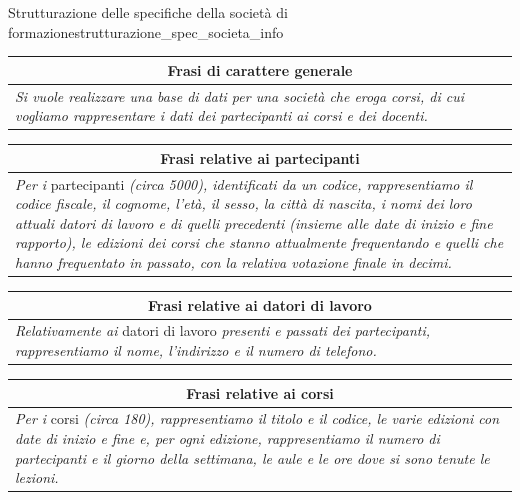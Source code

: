 \documentclass[12pt]{report}
\newcommand{\nmu}{}
\begin{document}
 	\begin{example}{\nmu Strutturazione delle specifiche della società di formazione}{strutturazione_spec_societa_info}
 		\noindent
 		\begin{tabular}{|p{14cm}|}
 			\hline
 			\multicolumn{1}{|c|}{\textbf{Frasi di carattere generale}} \\
 			\hline
 			\textit{Si vuole realizzare una base di dati per una società che eroga corsi, di cui vogliamo rappresentare i dati dei partecipanti ai corsi e dei docenti.} \\
 			\hline
 		\end{tabular}

 		\vspace{0.3cm}

 		\noindent
 		\begin{tabular}{|p{14cm}|}
 			\hline
 			\multicolumn{1}{|c|}{\textbf{Frasi relative ai partecipanti}} \\
 			\hline
 			\textit{Per i} partecipanti \textit{(circa 5000), identificati da un codice, rappresentiamo il codice fiscale, il cognome, l'età, il sesso, la città di nascita, i nomi dei loro attuali datori di lavoro e di quelli precedenti (insieme alle date di inizio e fine rapporto), le edizioni dei corsi che stanno attualmente frequentando e quelli che hanno frequentato in passato, con la relativa votazione finale in decimi.} \\
 			\hline
 		\end{tabular}

 		\vspace{0.3cm}

 		\noindent
 		\begin{tabular}{|p{14cm}|}
 			\hline
 			\multicolumn{1}{|c|}{\textbf{Frasi relative ai datori di lavoro}} \\
 			\hline
 			\textit{Relativamente ai} datori di lavoro \textit{presenti e passati dei partecipanti, rappresentiamo il nome, l'indirizzo e il numero di telefono.} \\
 			\hline
 		\end{tabular}

 		\vspace{0.3cm}

 		\noindent
 		\begin{tabular}{|p{14cm}|}
 			\hline
 			\multicolumn{1}{|c|}{\textbf{Frasi relative ai corsi}} \\
 			\hline
 			\textit{Per i} corsi \textit{(circa 180), rappresentiamo il titolo e il codice, le varie edizioni con date di inizio e fine e, per ogni edizione, rappresentiamo il numero di partecipanti e il giorno della settimana, le aule e le ore dove si sono tenute le lezioni.} \\
 			\hline
 		\end{tabular}


\end{example}
\end{document}
